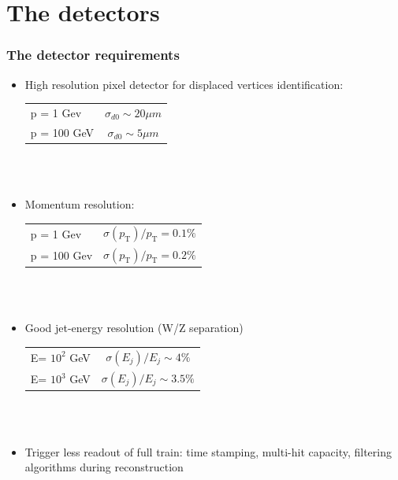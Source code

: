 \documentclass{beamer}
\begin{document}

\section{The detectors}
\begin{frame}
\frametitle{The detector requirements}
\begin{itemize}
  \item High resolution pixel detector for displaced vertices identification:\\
  {\scriptsize
  \begin{tabular}{lc}
  p = 1 Gev & $\sigma_{d0}\sim20\mu m$\\
  p = 100 GeV & $\sigma_{d0}\sim5\mu m$
  \end{tabular}
  }~\\ ~\\
  \item Momentum resolution:\\
  {\scriptsize 
  \begin{tabular}{lc}
   p = 1 Gev & $\sigma(p_{\textrm{T}})/p_{\textrm{T}}=0.1\%$\\
   p = 100 Gev & $\sigma(p_{\textrm{T}})/p_{\textrm{T}}=0.2\%$
  \end{tabular}
   }~\\ ~\\
  \item Good jet-energy resolution (W/Z separation)\\
  {\scriptsize 
  \begin{tabular}{lc}
  E= $10^2$ GeV & $\sigma(E_j)/E_j \sim4\%$\\
  E= $10^3$ GeV & $\sigma(E_j)/E_j \sim3.5\%$
  \end{tabular}
  }~\\ ~\\
  \item Trigger less readout of full train: time stamping, multi-hit capacity,
  filtering algorithms during reconstruction
\end{itemize}
\end{frame}
\end{document}
